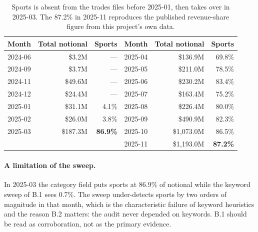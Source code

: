 \documentclass[11pt,a4paper]{article}
\begin{document}
\begin{table}[ht]
\centering\small
\begin{tabular}{lrr@{\hskip 1.2cm}lrr}
\toprule
Month & Total notional & Sports & Month & Total notional & Sports \\
\midrule
2024-06 & \$3.2M & --- & 2025-04 & \$136.9M & 69.8\% \\
2024-09 & \$3.7M & --- & 2025-05 & \$211.0M & 78.5\% \\
2024-11 & \$49.6M & --- & 2025-06 & \$230.2M & 83.4\% \\
2024-12 & \$24.4M & --- & 2025-07 & \$163.4M & 75.2\% \\
2025-01 & \$31.1M & 4.1\% & 2025-08 & \$226.4M & 80.0\% \\
2025-02 & \$26.0M & 3.8\% & 2025-09 & \$490.9M & 82.3\% \\
2025-03 & \$187.3M & \textbf{86.9\%} & 2025-10 & \$1{,}073.0M & 86.5\% \\
 & & & 2025-11 & \$1{,}193.0M & \textbf{87.2\%} \\
\bottomrule
\end{tabular}
\caption{Sports is absent from the trades files before 2025-01, then takes
over in 2025-03. The 87.2\% in 2025-11 reproduces the published revenue-share
figure from this project's own data.}
\end{table}

\paragraph{A limitation of the sweep.} In 2025-03 the category field puts
sports at 86.9\% of notional while the keyword sweep of B.1 sees 0.7\%. The
sweep under-detects sports by two orders of magnitude in that month, which is
the characteristic failure of keyword heuristics and the reason B.2 matters:
the audit never depended on keywords. B.1 should be read as corroboration, not
as the primary evidence.
\end{document}
